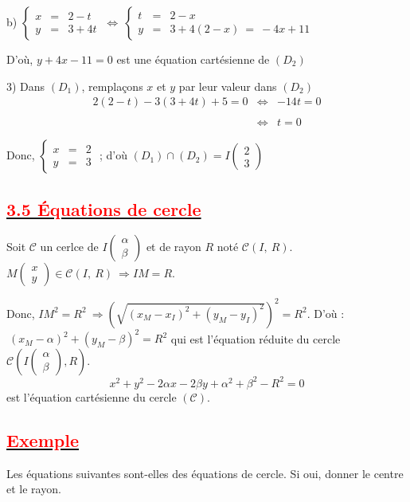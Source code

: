 \documentclass[12pt]{article}
\begin{document}
b) $\left\lbrace\begin{array}{rcl} x&=&2-t \\ y&=&3+4t\end{array}\right.\ \Leftrightarrow\ \left\lbrace\begin{array}{rcl} t&=&2-x \\ y&=&3+4(2-x)\ =\ -4x+11\end{array}\right.$

D'où, $y+4x-11=0$ est une équation cartésienne de $(D_{2})$

3) Dans $(D_{1})$, remplaçons $x$ et $y$ par leur valeur dans $(D_{2})$
	$$\begin{array}{rcl} 2(2-t)-3(3+4t)+5=0&\Leftrightarrow&-14t=0\\\\&\Leftrightarrow&t=0\end{array}$$
	
Donc, $\left\lbrace\begin{array}{rcl} x&=&2 \\ y&=&3\end{array}\right.$ ; d'où $(D_{1})\cap(D_{2})=I\begin{pmatrix} 2 \\ 3\end{pmatrix}$
\subsection*{\underline{\textcolor{red}{\textbf{3.5 Équations de cercle}}}}
Soit $\mathcal{C}$ un cerlce de $I\begin{pmatrix}
	\alpha\\
	\beta
	\end{pmatrix}$ et de rayon $R$ noté $\mathcal{C}(I,\ R).$
	$M\begin{pmatrix}
	x\\
	y
	\end{pmatrix}\in\mathcal{C}(I,\ R) \: \Rightarrow IM=R.$
	
Donc, $IM^{2}=R^{2} \: \Longrightarrow \left( \sqrt{(x_{M}-x_{I})^{2}+(y_{M}-y_{I})^{2}}\right)^{2}=R^{2}.$
	D'où : $\ (x_{M}-\alpha)^{2}+(y_{M}-\beta)^{2}=R^{2}$ qui est l'équation réduite du cercle $\mathcal{C}\left(I\begin{pmatrix}
	\alpha\\
	\beta
	\end{pmatrix}, R\right).$
	$$x^{2}+y^{2}-2\alpha x-2\beta y+\alpha^{2}+\beta^{2}-R^{2}=0$$ est l'équation cartésienne du cercle $(\mathcal{C}).$
\subsection*{\underline{\textcolor{red}{\textbf{Exemple}}}}
Les équations suivantes sont-elles des équations de cercle. Si oui, donner le centre et le rayon.
\end{document}
